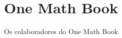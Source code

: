 \documentclass[11pt,a4paper,twoside,openany]{book}
\title{One Math Book}
\author{Os colaboradores do One Math Book}
\date{\bookdate}
\begin{document}
\frontmatter



\tableofcontents

\mainmatter





\appendix
\part{\omsolutionspart}




\backmatter
\printindex
\end{document}

